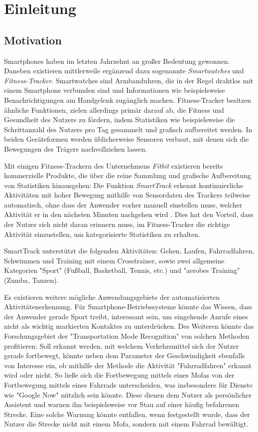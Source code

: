 \chapter{Einleitung}
\label{chap:introduction}
\section{Motivation}
Smartphones haben im letzten Jahrzehnt an großer Bedeutung gewonnen. Daneben existieren mittlerweile ergänzend dazu sogenannte \textit{Smartwatches} und \textit{Fitness-Tracker}. Smartwatches sind Armbanduhren, die in der Regel drahtlos mit einem Smartphone verbunden sind und Informationen wie beispielsweise Benachrichtigungen am Handgelenk zugänglich machen. Fitness-Tracker besitzen ähnliche Funktionen, zielen allerdings primär darauf ab, die Fitness und Gesundheit des Nutzers zu fördern, indem Statistiken wie beispielsweise die Schrittanzahl des Nutzers pro Tag gesammelt und grafisch aufbereitet werden. In beiden Geräteformen werden üblicherweise Sensoren verbaut, mit denen sich die Bewegungen des Trägers nachvollziehen lassen.

Mit einigen Fitness-Trackern des Unternehmens \textit{Fitbit} existieren bereits kommerzielle Produkte, die über die reine Sammlung und grafische Aufbereitung von Statistiken hinausgehen: Die Funktion \textit{SmartTrack} erkennt kontinuierliche Aktivitäten mit hoher Bewegung mithilfe von Sensordaten des Trackers teilweise automatisch, ohne dass der Anwender vorher manuell einstellen muss, welcher Aktivität er in den nächsten Minuten nachgehen wird \cite{FitbitSmartTrack}. Dies hat den Vorteil, dass der Nutzer sich nicht daran erinnern muss, im Fitness-Tracker die richtige Aktivität einzustellen, um kategorisierte Statistiken zu erhalten.

SmartTrack unterstützt die folgenden Aktivitäten: Gehen, Laufen, Fahrradfahren, Schwimmen und Training mit einem Crosstrainer, sowie zwei allgemeine Kategorien "Sport" (Fußball, Basketball, Tennis, etc.) und "aerobes Training" (Zumba, Tanzen).

Es existieren weitere mögliche Anwendungsgebiete der automatisierten Aktivitätenerkennung. Für Smartphone-Betriebssysteme könnte das Wissen, dass der Anwender gerade Sport treibt, interessant sein, um eingehende Anrufe eines nicht als wichtig markierten Kontaktes zu unterdrücken. Des Weiteren könnte das Forschungsgebiet der "Transportation Mode Recognition" von solchen Methoden profitieren: Soll erkannt werden, mit welchem Verkehrsmittel sich der Nutzer gerade fortbewegt, könnte neben dem Parameter der Geschwindigkeit ebenfalls von Interesse ein, ob mithilfe der Methode die Aktivität "Fahrradfahren" erkannt wird oder nicht. So ließe sich die Fortbewegung mittels eines Mofas von der Fortbewegung mittels eines Fahrrads unterscheiden, was insbesondere für Dienste wie "Google Now" nützlich sein könnte. Diese dienen dem Nutzer als persönlicher Assistent und warnen ihn beispielsweise vor Stau auf einer häufig befahrenen Strecke. Eine solche Warnung könnte entfallen, wenn festgestellt wurde, dass der Nutzer die Strecke nicht mit einem Mofa, sondern mit einem Fahrrad bewältigt.

